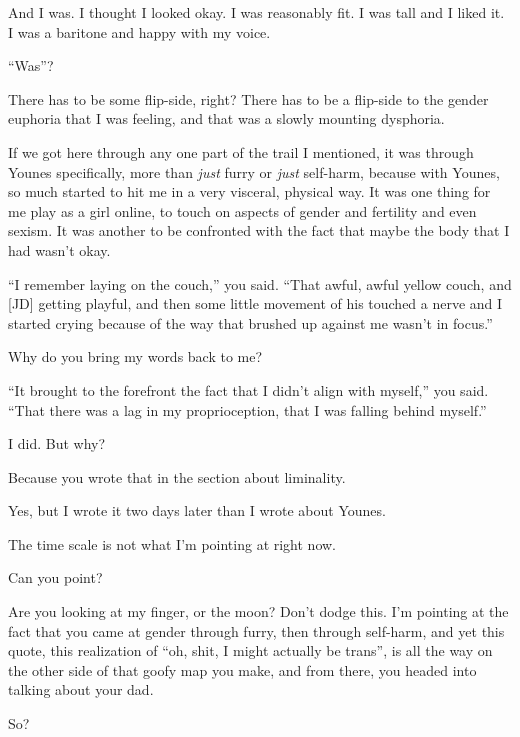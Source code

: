 \begin{paracol}{2}
\begin{leftcolumn}
And I was. I thought I looked okay. I was reasonably fit. I was tall and I liked it. I was a baritone and happy with my voice.

\begin{ally}
``Was''?
\end{ally}
There has to be some flip-side, right? There has to be a flip-side to the gender euphoria that I was feeling, and that was a slowly mounting dysphoria.

If we got here through any one part of the trail I mentioned, it was through Younes specifically, more than \emph{just} furry or \emph{just} self-harm, because with Younes, so much started to hit me in a very visceral, physical way. It was one thing for me play as a girl online, to touch on aspects of gender and fertility and even sexism. It was another to be confronted with the fact that maybe the body that I had wasn't okay.

\begin{ally}
``I remember laying on the couch,'' you said. ``That awful, awful yellow couch, and {[}JD{]} getting playful, and then some little movement of his touched a nerve and I started crying because of the way that brushed up against me wasn't in focus.''
\end{ally}
Why do you bring my words back to me?

\begin{ally}
``It brought to the forefront the fact that I didn't align with myself,'' you said. ``That there was a lag in my proprioception, that I was falling behind myself.''
\end{ally}
I did. But why?

\begin{ally}
Because you wrote that in the section about liminality.
\end{ally}
Yes, but I wrote it two days later than I wrote about Younes.

\begin{ally}
The time scale is not what I'm pointing at right now.
\end{ally}
Can you point?

\begin{ally}
Are you looking at my finger, or the moon? Don't dodge this. I'm pointing at the fact that you came at gender through furry, then through self-harm, and yet this quote, this realization of ``oh, shit, I might actually be trans'', is all the way on the other side of that goofy map you make, and from there, you headed into talking about your dad.
\end{ally}
So?


\end{leftcolumn}
\end{paracol}
